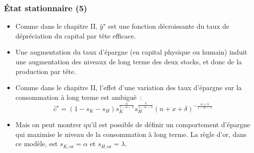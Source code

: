\documentclass[10pt,notheorems]{beamer}
\theoremstyle{plain}
\theoremstyle{definition} %
\begin{document}
\begin{frame}
  \frametitle{État stationnaire (5)}

  \begin{itemize}

  \item Comme dans le chapitre II, $\hat y^\star$ est une fonction décroissante du taux de dépréciation du capital par tête efficace.\newline

  \item Une augmentation du taux d'épargne (en capital physique ou humain) induit une augmentation des niveaux de long terme des deux stocks, et donc de la production par tête.\newline

  \item Comme dans le chapitre II, l'effet d'une variation des taux d'épargne sur la consommation à long terme est ambiguë~:
    \[
      \hat c^{\star} = (1-s_K-s_H)s_K^{\frac{\alpha}{1-\alpha-\lambda}}s_H^{\frac{\lambda}{1-\alpha-\lambda}}(n+x+\delta)^{-\frac{\alpha+\lambda}{1-\alpha-\lambda}}
    \]

  \item Mais on peut montrer qu'il est possible de définir un comportement d'épargne qui maximise le niveau de la consommation à long terme. La règle d'or, dans ce modèle, est $s_{K,\text{or}}=\alpha$ et $s_{H,\text{or}}=\lambda$.

  \end{itemize}

\end{frame}
\end{document}
